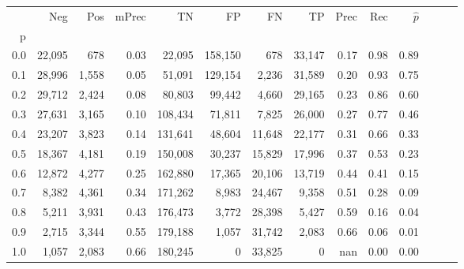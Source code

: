 \begin{tabular}{rrrrrrrrrrrrrr}
\toprule
{} &     Neg &    Pos & mPrec &       TN &       FP &      FN &      TP &  Prec &   Rec & $\hat{p}$ \\
p   &         &        &       &          &          &         &         &       &       &           \\
\midrule
0.0 &  22,095 &    678 &  0.03 &   22,095 &  158,150 &     678 &  33,147 &  0.17 &  0.98 &      0.89 \\
0.1 &  28,996 &  1,558 &  0.05 &   51,091 &  129,154 &   2,236 &  31,589 &  0.20 &  0.93 &      0.75 \\
0.2 &  29,712 &  2,424 &  0.08 &   80,803 &   99,442 &   4,660 &  29,165 &  0.23 &  0.86 &      0.60 \\
0.3 &  27,631 &  3,165 &  0.10 &  108,434 &   71,811 &   7,825 &  26,000 &  0.27 &  0.77 &      0.46 \\
0.4 &  23,207 &  3,823 &  0.14 &  131,641 &   48,604 &  11,648 &  22,177 &  0.31 &  0.66 &      0.33 \\
0.5 &  18,367 &  4,181 &  0.19 &  150,008 &   30,237 &  15,829 &  17,996 &  0.37 &  0.53 &      0.23 \\
0.6 &  12,872 &  4,277 &  0.25 &  162,880 &   17,365 &  20,106 &  13,719 &  0.44 &  0.41 &      0.15 \\
0.7 &   8,382 &  4,361 &  0.34 &  171,262 &    8,983 &  24,467 &   9,358 &  0.51 &  0.28 &      0.09 \\
0.8 &   5,211 &  3,931 &  0.43 &  176,473 &    3,772 &  28,398 &   5,427 &  0.59 &  0.16 &      0.04 \\
0.9 &   2,715 &  3,344 &  0.55 &  179,188 &    1,057 &  31,742 &   2,083 &  0.66 &  0.06 &      0.01 \\
1.0 &   1,057 &  2,083 &  0.66 &  180,245 &        0 &  33,825 &       0 &   nan &  0.00 &      0.00 \\
\bottomrule
\end{tabular}

